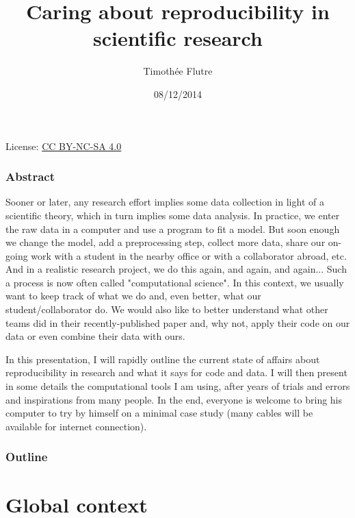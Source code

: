 \documentclass[c]{beamer} %
\title[Reproducible research]{Caring about reproducibility in scientific research}
\author[T. Flutre]{Timoth\'{e}e Flutre}
\institute[INRA]{INRA, UMR AGAP}
\date{08/12/2014}
\begin{document}
\begin{frame}
  \titlepage
  
  \tiny
  \begin{center}
    License: \href{http://creativecommons.org/licenses/by-nc-sa/4.0/}{CC BY-NC-SA 4.0}
  \end{center}
\end{frame}                                                                                                                       
\begin{frame}
  \frametitle{Abstract}
  \tiny
  Sooner or later, any research effort implies some data collection in light of a scientific theory, which in turn implies some data analysis. In practice, we enter the raw data in a computer and use a program to fit a model. But soon enough we change the model, add a preprocessing step, collect more data, share our on-going work with a student in the nearby office or with a collaborator abroad, etc. And in a realistic research project, we do this again, and again, and again... Such a process is now often called "computational science". In this context, we usually want to keep track of what we do and, even better, what our student/collaborator do. We would also like to better understand what other teams did in their recently-published paper and, why not, apply their code on our data or even combine their data with ours.
  
  \medskip
  
  In this presentation, I will rapidly outline the current state of affairs about reproducibility in research and what it says for code and data. I will then present in some details the computational tools I am using, after years of trials and errors and inspirations from many people. In the end, everyone is welcome to bring his computer to try by himself on a minimal case study (many cables will be available for internet connection).
  
\end{frame}

\begin{frame}
  \frametitle{Outline}
  \tableofcontents
\end{frame}

\section{Global context}
\end{document}
